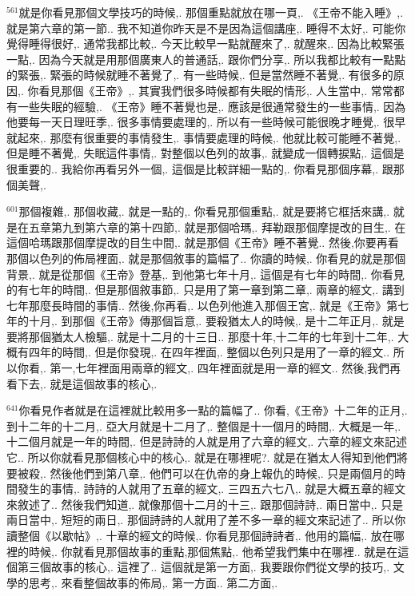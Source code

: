 \documentclass{book}
\begin{document}
$^{561}$就是你看見那個文學技巧的時候,.
那個重點就放在哪一頁,.
《王帝不能入睡》,.
就是第六章的第一節..
我不知道你昨天是不是因為這個講座,.
睡得不太好,.
可能你覺得睡得很好,.
通常我都比較,.
今天比較早一點就醒來了,.
就醒來,.
因為比較緊張一點,.
因為今天就是用那個廣東人的普通話,.
跟你們分享,.
所以我都比較有一點點的緊張,.
緊張的時候就睡不著覺了,.
有一些時候,.
但是當然睡不著覺,.
有很多的原因,.
你看見那個《王帝》,.
其實我們很多時候都有失眠的情形,.
人生當中,.
常常都有一些失眠的經驗,.
《王帝》睡不著覺也是,.
應該是很通常發生的一些事情,.
因為他要每一天日理旺季,.
很多事情要處理的,.
所以有一些時候可能很晚才睡覺,.
很早就起來,.
那麼有很重要的事情發生,.
事情要處理的時候,.
他就比較可能睡不著覺,.
但是睡不著覺,.
失眠這件事情,.
對整個以色列的故事,.
就變成一個轉捩點,.
這個是很重要的..
我給你再看另外一個,.
這個是比較詳細一點的,.
你看見那個序幕,.
跟那個美聲,.

$^{601}$那個複雜,.
那個收藏,.
就是一點的,.
你看見那個重點,.
就是要將它框括來講,.
就是在五章第九到第六章的第十四節,.
就是那個哈瑪,.
拜勒跟那個摩提改的目生,.
在這個哈瑪跟那個摩提改的目生中間,.
就是那個《王帝》睡不著覺..
然後,你要再看那個以色列的佈局裡面,.
就是那個敘事的篇幅了..
你讀的時候,.
你看見的就是那個背景,.
就是從那個《王帝》登基,.
到他第七年十月,.
這個是有七年的時間,.
你看見的有七年的時間,.
但是那個敘事節,.
只是用了第一章到第二章,.
兩章的經文,.
講到七年那麼長時間的事情..
然後,你再看,.
以色列他進入那個王宮,.
就是《王帝》第七年的十月,.
到那個《王帝》傳那個旨意,.
要殺猶太人的時候,.
是十二年正月,.
就是要將那個猶太人檢驅,.
就是十二月的十三日..
那麼十年,十二年的七年到十二年,.
大概有四年的時間,.
但是你發現,.
在四年裡面,.
整個以色列只是用了一章的經文..
所以你看,.
第一,七年裡面用兩章的經文,.
四年裡面就是用一章的經文..
然後,我們再看下去,.
就是這個故事的核心,.

$^{641}$你看見作者就是在這裡就比較用多一點的篇幅了..
你看,《王帝》十二年的正月,.
到十二年的十二月,.
亞大月就是十二月了,.
整個是十一個月的時間,.
大概是一年,.
十二個月就是一年的時間,.
但是詩詩的人就是用了六章的經文,.
六章的經文來記述它..
所以你就看見那個核心中的核心,.
就是在哪裡呢?.
就是在猶太人得知到他們將要被殺,.
然後他們到第八章,.
他們可以在仇帝的身上報仇的時候,.
只是兩個月的時間發生的事情,.
詩詩的人就用了五章的經文,.
三四五六七八,.
就是大概五章的經文來敘述了..
然後我們知道,.
就像那個十二月的十三,.
跟那個詩詩,.
兩日當中,.
只是兩日當中,.
短短的兩日,.
那個詩詩的人就用了差不多一章的經文來記述了..
所以你讀整個《以歇帖》,.
十章的經文的時候,.
你看見那個詩詩者,.
他用的篇幅,.
放在哪裡的時候,.
你就看見那個故事的重點,那個焦點,.
他希望我們集中在哪裡..
就是在這個第三個故事的核心,.
這裡了..
這個就是第一方面,.
我要跟你們從文學的技巧,.
文學的思考,.
來看整個故事的佈局,.
第一方面..
第二方面,.
\end{document}
